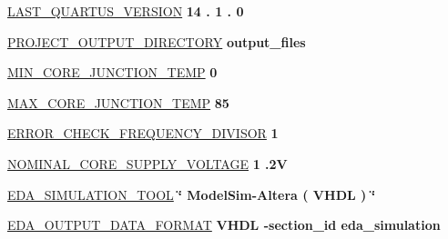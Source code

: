 \begin{DoxyCompactItemize}
\item 
\hyperlink{_d_e0___n_a_n_o___v_f_8qsf_af9b4f5153c889c7aad3c78695bcf0cee}{L\+A\+S\+T\+\_\+\+Q\+U\+A\+R\+T\+U\+S\+\_\+\+V\+E\+R\+S\+I\+O\+N} {\bfseries  \textcolor{vhdldigit}{14} \textcolor{vhdlchar}{.} \textcolor{vhdldigit}{1} \textcolor{vhdlchar}{.} \textcolor{vhdldigit}{0} \textcolor{vhdlchar}{ }} 
\item 
\hyperlink{_d_e0___n_a_n_o___v_f_8qsf_aeca3aec4715d85dc6e882cad8038f949}{P\+R\+O\+J\+E\+C\+T\+\_\+\+O\+U\+T\+P\+U\+T\+\_\+\+D\+I\+R\+E\+C\+T\+O\+R\+Y} {\bfseries \textcolor{vhdlchar}{output\+\_\+files}\textcolor{vhdlchar}{ }} 
\item 
\hyperlink{_d_e0___n_a_n_o___v_f_8qsf_a5769c0f9c049888fc60edca28f890fdb}{M\+I\+N\+\_\+\+C\+O\+R\+E\+\_\+\+J\+U\+N\+C\+T\+I\+O\+N\+\_\+\+T\+E\+M\+P} {\bfseries  \textcolor{vhdldigit}{0} \textcolor{vhdlchar}{ }} 
\item 
\hyperlink{_d_e0___n_a_n_o___v_f_8qsf_a0398daaf5e8a92ea1cedcad52a33d23f}{M\+A\+X\+\_\+\+C\+O\+R\+E\+\_\+\+J\+U\+N\+C\+T\+I\+O\+N\+\_\+\+T\+E\+M\+P} {\bfseries  \textcolor{vhdldigit}{85} \textcolor{vhdlchar}{ }} 
\item 
\hyperlink{_d_e0___n_a_n_o___v_f_8qsf_af683df31e9d4c4217389db00b7bc829a}{E\+R\+R\+O\+R\+\_\+\+C\+H\+E\+C\+K\+\_\+\+F\+R\+E\+Q\+U\+E\+N\+C\+Y\+\_\+\+D\+I\+V\+I\+S\+O\+R} {\bfseries  \textcolor{vhdldigit}{1} \textcolor{vhdlchar}{ }} 
\item 
\hyperlink{_d_e0___n_a_n_o___v_f_8qsf_a35065386cc8fb5cbcc42e9e1083d14b7}{N\+O\+M\+I\+N\+A\+L\+\_\+\+C\+O\+R\+E\+\_\+\+S\+U\+P\+P\+L\+Y\+\_\+\+V\+O\+L\+T\+A\+G\+E} {\bfseries  \textcolor{vhdldigit}{1} \textcolor{vhdlchar}{.}\textcolor{vhdlchar}{2\+V}\textcolor{vhdlchar}{ }} 
\item 
\hyperlink{_d_e0___n_a_n_o___v_f_8qsf_a9b34d84e231e437391c53496179a9ff5}{E\+D\+A\+\_\+\+S\+I\+M\+U\+L\+A\+T\+I\+O\+N\+\_\+\+T\+O\+O\+L} {\bfseries \textcolor{vhdlchar}{\char`\"{}}\textcolor{vhdlchar}{ }\textcolor{vhdlchar}{Model\+Sim}\textcolor{vhdlchar}{-\/}\textcolor{vhdlchar}{Altera}\textcolor{vhdlchar}{ }\textcolor{vhdlchar}{(}\textcolor{vhdlchar}{ }\textcolor{vhdlchar}{V\+H\+D\+L}\textcolor{vhdlchar}{ }\textcolor{vhdlchar}{)}\textcolor{vhdlchar}{ }\textcolor{vhdlchar}{\char`\"{}}\textcolor{vhdlchar}{ }} 
\item 
\hyperlink{_d_e0___n_a_n_o___v_f_8qsf_aefa188e124805b4c730a8c853abf4718}{E\+D\+A\+\_\+\+O\+U\+T\+P\+U\+T\+\_\+\+D\+A\+T\+A\+\_\+\+F\+O\+R\+M\+A\+T} {\bfseries \textcolor{vhdlchar}{V\+H\+D\+L}\textcolor{vhdlchar}{ }\textcolor{vhdlchar}{-\/}\textcolor{vhdlchar}{section\+\_\+id}\textcolor{vhdlchar}{ }\textcolor{vhdlchar}{eda\+\_\+simulation}\textcolor{vhdlchar}{ }} 

\end{DoxyCompactItemize}
